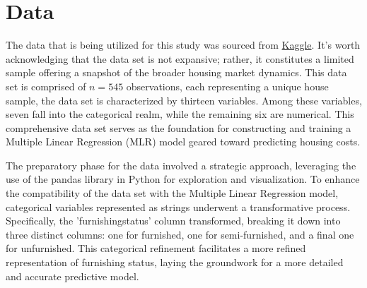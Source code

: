 \documentclass[12pt]{article}
\begin{document}
\section{Data}
\label{sec:data}


The data that is being utilized for this study was sourced from \href{https://www.kaggle.com/code/ashydv/housing-price-prediction-linear-regression/input}{Kaggle}. It's worth acknowledging that the data set is not expansive; rather, it constitutes a limited sample offering a snapshot of the broader housing market dynamics. This data set is comprised of \(n = 545\) observations, each representing a unique house sample, the data set is characterized by thirteen variables. Among these variables, seven fall into the categorical realm, while the remaining six are numerical. This comprehensive data set serves as the foundation for constructing and training a Multiple Linear Regression (MLR) model geared toward predicting housing costs.

The preparatory phase for the data involved a strategic approach, leveraging the use of the pandas library in Python for exploration and visualization. To enhance the compatibility of the data set with the Multiple Linear Regression model, categorical variables represented as strings underwent a transformative process. Specifically, the 'furnishingstatus' column transformed, breaking it down into three distinct columns: one for furnished, one for semi-furnished, and a final one for unfurnished. This categorical refinement facilitates a more refined representation of furnishing status, laying the groundwork for a more detailed and accurate predictive model.

\bigskip
\end{document}
